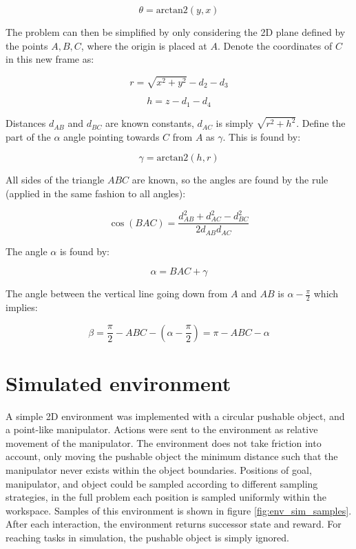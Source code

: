 \begin{equation}
    \theta = \text{arctan2}(y, x)
\end{equation}

The problem can then be simplified by only considering the 2D plane defined by
the points $A, B, C$, where the origin is placed at $A$.  Denote the
coordinates of $C$ in this new frame as:

\begin{equation}
    r = \sqrt{x^2 + y^2} - d_2 - d_3
\end{equation}

\begin{equation}
    h = z - d_1 - d_4
\end{equation}

Distances $d_{AB}$ and $d_{BC}$ are known constants, $d_{AC}$ is simply
$\sqrt{r^2 + h^2}$. Define the part of the $\alpha$ angle pointing towards
$C$ from $A$ as $\gamma$. This is found by:

\begin{equation}
    \gamma = \text{arctan2}(h, r)
\end{equation}

All sides of the triangle $ABC$ are known, so the angles are found by the rule (applied in the same fashion to all angles):

\begin{equation}
    \cos(BAC) = \frac{d_{AB}^2 + d_{AC}^2 - d_{BC}^2}{2 d_{AB} d_{AC}}
\end{equation}

The angle $\alpha$ is found by:

\begin{equation}
    \alpha = BAC + \gamma
\end{equation}

The angle between the vertical line going down from $A$ and $AB$ is $\alpha - \frac{\pi}{2}$
which implies:

\begin{equation}
    \beta = \frac{\pi}{2} - ABC - (\alpha - \frac{\pi}{2}) = \pi - ABC - \alpha
\end{equation}

\section{Simulated environment}
\label{sec:method_simulated}

A simple 2D environment was implemented with a circular pushable object, and a
point-like manipulator. Actions were sent to the environment as relative
movement of the manipulator. The environment does not take friction into
account, only moving the pushable object the minimum distance such that the
manipulator never exists within the object boundaries. Positions of goal,
manipulator, and object could be sampled according to different sampling
strategies, in the full problem each position is sampled uniformly within the
workspace. Samples of this environment is shown in figure
\ref{fig:env_sim_samples}. After each interaction, the environment returns
successor state and reward. For reaching tasks in simulation, the pushable
object is simply ignored.

